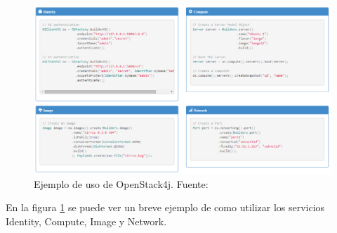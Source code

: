 \begin{figure}[!ht]
	\centering
	\includegraphics[width=1\linewidth]{imagenes/ejemplo_os4j}
	\caption{Ejemplo de uso de OpenStack4j. Fuente:\cite{openstack4jbib}}
	\label{fig:ejemploos4j}
\end{figure}

En la figura \ref{fig:ejemploos4j} se puede ver un breve ejemplo de como utilizar los servicios Identity, Compute, Image y Network.




\cleardoublepage
